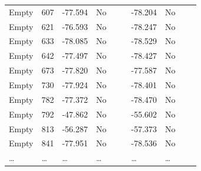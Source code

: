 \begin{table}[H]
{\begin{tabular}{|l|p{}|p{}|p{}|p{}|p{}|p{}|p{}|p{}|p{}|}
    Empty          						& 607                    							& -77.594				& No 									&							&							& -78.204				& No                              	&              				&               			\\ \cline{1-4}\cline{7-8}
    Empty          						& 621                    							& -76.593				& No 									&							&							& -78.247				& No                              	&              				&               			\\ \cline{1-4}\cline{7-8}
    Empty          						& 633                    							& -78.085				& No 									&							&							& -78.529				& No                              	&              				&               			\\ \cline{1-4}\cline{7-8}
    Empty          						& 642                    							& -77.497				& No 									&							&							& -78.427				& No                              	&              				&               			\\ \cline{1-4}\cline{7-8}
    Empty          						& 673                    							& -77.820				& No 									&							&							& -77.587				& No                              	&              				&               			\\ \cline{1-4}\cline{7-8}
    Empty          						& 730                    							& -77.924				& No 									&							&							& -78.401				& No                              	&              				&               			\\ \cline{1-4}\cline{7-8}
    Empty          						& 782                    							& -77.372				& No 									&							&							& -78.470				& No                              	&              				&               			\\ \cline{1-4}\cline{7-8}
    Empty          						& 792                    							& -47.862				& No 									&							&							& -55.602				& No                              	&              				&               			\\ \cline{1-4}\cline{7-8}
    Empty          						& 813                    							& -56.287				& No 									&							&							& -57.373				& No                              	&              				&               			\\ \cline{1-4}\cline{7-8}
    Empty          						& 841                    							& -77.951				& No 									&							&							& -78.536				& No                              	&              				&               			\\ \cline{1-4}\cline{7-8}
    …              						& …                      							& …        				& …										&							&							& …      				& …                               	&              				&               			\\ \hline
    \end{tabular}}%
\end{table}

